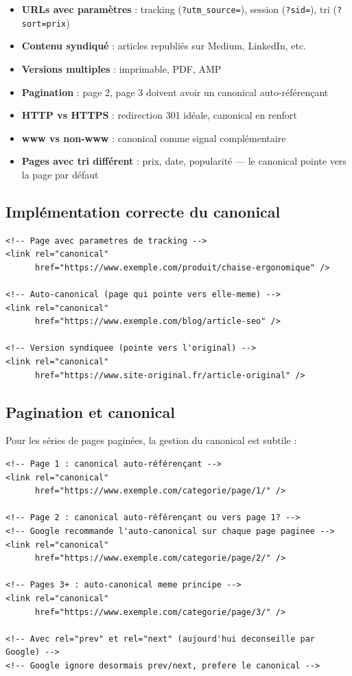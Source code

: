 \documentclass[12pt,a4paper,twoside]{report}
\begin{document}
\begin{itemize}
    \item \textbf{URLs avec paramètres} : tracking (\texttt{?utm\_source=}), session (\texttt{?sid=}), tri (\texttt{?sort=prix})
    \item \textbf{Contenu syndiqué} : articles republiés sur Medium, LinkedIn, etc.
    \item \textbf{Versions multiples} : imprimable, PDF, AMP
    \item \textbf{Pagination} : page 2, page 3 doivent avoir un canonical auto-référençant
    \item \textbf{HTTP vs HTTPS} : redirection 301 idéale, canonical en renfort
    \item \textbf{www vs non-www} : canonical comme signal complémentaire
    \item \textbf{Pages avec tri différent} : prix, date, popularité — le canonical pointe vers la page par défaut
\end{itemize}

\subsection{Implémentation correcte du canonical}

\begin{lstlisting}[style=htmlcode,caption={Implémentation du tag canonical dans le <head>}]
<!-- Page avec parametres de tracking -->
<link rel="canonical"
      href="https://www.exemple.com/produit/chaise-ergonomique" />

<!-- Auto-canonical (page qui pointe vers elle-meme) -->
<link rel="canonical"
      href="https://www.exemple.com/blog/article-seo" />

<!-- Version syndiquee (pointe vers l'original) -->
<link rel="canonical"
      href="https://www.site-original.fr/article-original" />
\end{lstlisting}

\subsection{Pagination et canonical}

Pour les séries de pages paginées, la gestion du canonical est subtile :

\begin{lstlisting}[style=htmlcode,caption={Canonical pour la pagination}]
<!-- Page 1 : canonical auto-référençant -->
<link rel="canonical"
      href="https://www.exemple.com/categorie/page/1/" />

<!-- Page 2 : canonical auto-référençant ou vers page 1? -->
<!-- Google recommande l'auto-canonical sur chaque page paginee -->
<link rel="canonical"
      href="https://www.exemple.com/categorie/page/2/" />

<!-- Pages 3+ : auto-canonical meme principe -->
<link rel="canonical"
      href="https://www.exemple.com/categorie/page/3/" />

<!-- Avec rel="prev" et rel="next" (aujourd'hui deconseille par Google) -->
<!-- Google ignore desormais prev/next, prefere le canonical -->
\end{lstlisting}
\end{document}

